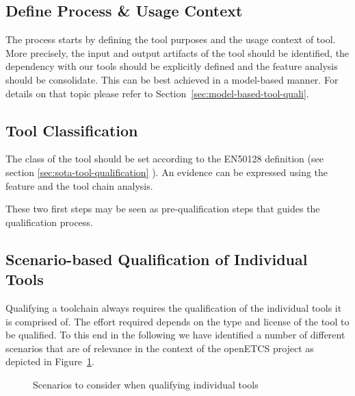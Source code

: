 \subsection{Define Process \& Usage Context}
The process starts by defining the tool purposes and the usage context
of tool. More precisely, the input and output artifacts of the tool
should be identified, the dependency with our tools should be
explicitly defined and the feature analysis should be consolidate. This can be best achieved in a model-based manner. 
For details on that topic please refer to Section~\ref{sec:model-based-tool-quali}.

\subsection{Tool Classification}
The class of the tool should be set according to the EN50128
definition (see section \ref{sec:sota-tool-qualification} ). An evidence can be expressed using the feature and
the tool chain analysis.


These two first steps may be seen as pre-qualification steps that
guides the qualification process.

\subsection{Scenario-based Qualification of Individual Tools}
\label{sec:scenario-based-tool-quali}


Qualifying a toolchain always requires the qualification of the individual tools it is comprised of. The effort required depends on the type and license of the tool to be qualified. To this end in the following we have identified a number of different scenarios that are of relevance in the context of the openETCS project as depicted in Figure~\ref{fig:tool-qualification-scenarios}.

\begin{figure}[htbp]
\begin{center}
\end{center}
\caption{Scenarios to consider when qualifying individual tools}
\label{fig:tool-qualification-scenarios}
\end{figure}

